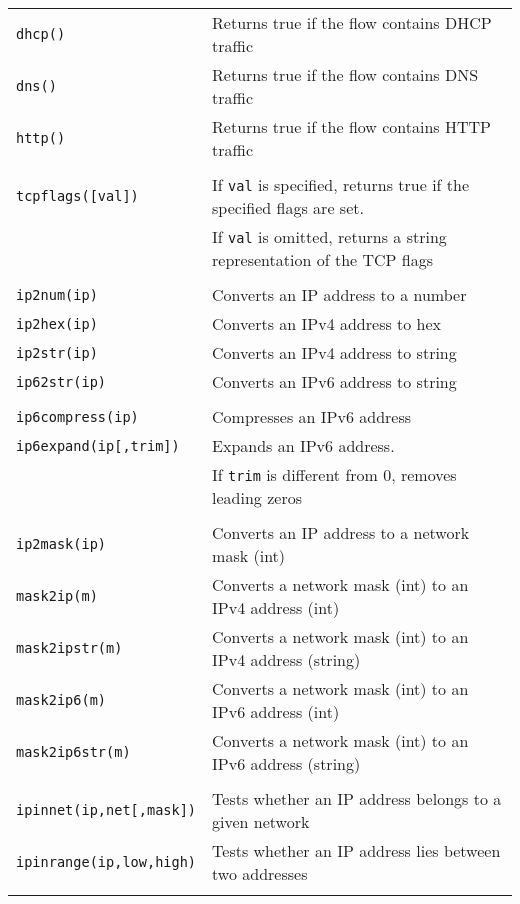 \documentclass[documentation]{subfiles}
\begin{document}
\begin{longtable}{ll}
    {\tt dhcp()} & Returns true if the flow contains DHCP traffic\\
    {\tt dns()}  & Returns true if the flow contains DNS traffic\\
    {\tt http()} & Returns true if the flow contains HTTP traffic\\\\

    {\tt tcpflags([val])} & If {\tt val} is specified, returns true if the specified flags are set.\\
                          & If {\tt val} is omitted, returns a string representation of the TCP flags\\\\

    {\tt ip2num(ip)}  & Converts an IP address to a number\\
    {\tt ip2hex(ip)}  & Converts an IPv4 address to hex\\
    {\tt ip2str(ip)}  & Converts an IPv4 address to string\\
    {\tt ip62str(ip)} & Converts an IPv6 address to string\\\\

    {\tt ip6compress(ip)}      & Compresses an IPv6 address\\
    {\tt ip6expand(ip[,trim])} & Expands an IPv6 address.\\
                               & If {\tt trim} is different from 0, removes leading zeros\\\\

    {\tt ip2mask(ip)}    & Converts an IP address to a network mask (int)\\
    {\tt mask2ip(m)}     & Converts a network mask (int) to an IPv4 address (int)\\
    {\tt mask2ipstr(m)}  & Converts a network mask (int) to an IPv4 address (string)\\
    {\tt mask2ip6(m)}    & Converts a network mask (int) to an IPv6 address (int)\\
    {\tt mask2ip6str(m)} & Converts a network mask (int) to an IPv6 address (string)\\\\

    {\tt ipinnet(ip,net[,mask])} & Tests whether an IP address belongs to a given network\\
    {\tt ipinrange(ip,low,high)} & Tests whether an IP address lies between two addresses\\\\


\end{longtable}
\end{document}
